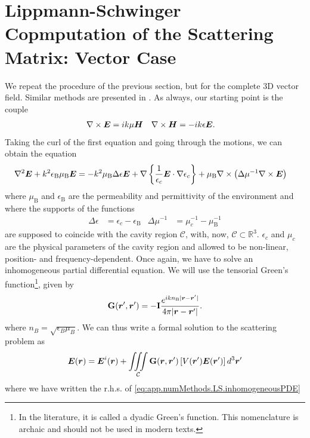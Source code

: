 \section{Lippmann-Schwinger Copmputation of the Scattering Matrix: Vector Case}
We repeat the procedure of the previous section, but for the complete 3D vector
field. Similar methods are presented in \cite{deL2013,FAL2013}. As always, 
our starting point is the couple
	\begin{align}
		\nabla\times\boldsymbol{E}	& =ik\mu\boldsymbol{H}	& \nabla\times\boldsymbol{H}	&=-ik\epsilon\boldsymbol{E}.
	\end{align}
Taking the curl of the first equation and going through the motions, 
we can obtain the equation
	\begin{align}
		\label{eq:app.numMethods.LS.inhomogeneousPDE}
		\nabla^2\boldsymbol{E}+k^2\epsilon_\text{B}\mu_\text{B}\boldsymbol{E}	&=	-k^2\mu_\text{B}\Delta\epsilon\boldsymbol{E}
																	+\nabla\left\{\frac{1}{\epsilon_c}\boldsymbol{E}\cdot\nabla\epsilon_c\right\}	
																	+\mu_\text{B}\nabla\times\left(\Delta\mu^{-1}\nabla\times\boldsymbol{E}\right)
	\end{align}
where $\mu_\text{B}$ and $\epsilon_\text{B}$ are the permeability and permittivity
of the environment and where the supports of the functions
	\begin{align}
		\Delta\epsilon &= \epsilon_c-\epsilon_\text{B}	&	\Delta\mu^{-1}	&=\mu_c^{-1}-\mu_\text{B}^{-1}
	\end{align}
are supposed to coincide with the cavity region $\mathcal{C}$, 
with, now, $\mathcal{C}\subset\mathbb{R}^3$. $\epsilon_c$ 
and $\mu_c$ are the physical parameters of the cavity 
region and allowed to be non-linear, position- and frequency-dependent.
Once again, we have to solve an inhomogeneous partial differential equation.
We will use the tensorial Green's function\footnote{In the literature, it is called a dyadic 
Green's function. This nomenclature is archaic and should not be used in 
modern texts.}, given by \cite{NOV2012}
	\begin{equation}
		\mathbf{G}(\boldsymbol{r}',\boldsymbol{r}') = -\mathbf{I}\frac{e^{ikn_\text{B}|\boldsymbol{r}-\boldsymbol{r}'|}}{4\pi|\boldsymbol{r}-\boldsymbol{r}'|}.
	\end{equation}
where $n_B=\sqrt{\epsilon_B\mu_B}$. We can thus write a formal solution 
to the scattering problem as
	\begin{equation}
		\boldsymbol{E}(\boldsymbol{r}) = \boldsymbol{E}^i(\boldsymbol{r})
						+\mathop{\iiint}_\mathcal{C}\mathbf{G}(\boldsymbol{r},\boldsymbol{r}')\left[V(\boldsymbol{r}')\boldsymbol{E}(\boldsymbol{r}')\right]d^3\boldsymbol{r}'
	\end{equation}
where we have written the r.h.s. of \eqref{eq:app.numMethods.LS.inhomogeneousPDE}
